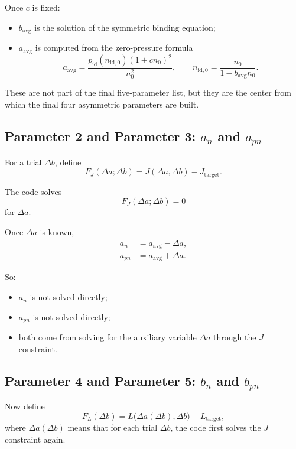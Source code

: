 \documentclass[11pt]{article}
\begin{document}
Once $c$ is fixed:
\begin{itemize}
\item $b_{\mathrm{avg}}$ is the solution of the symmetric binding equation;
\item $a_{\mathrm{avg}}$ is computed from the zero-pressure formula
\[
a_{\mathrm{avg}}
=
\frac{p_{\mathrm{id}}(n_{\mathrm{id},0})(1+cn_0)^2}{n_0^2},
\qquad
n_{\mathrm{id},0}=\frac{n_0}{1-b_{\mathrm{avg}}n_0}.
\]
\end{itemize}

These are not part of the final five-parameter list, but they are the center
from which the final four asymmetric parameters are built.

\subsection{Parameter 2 and Parameter 3: \texorpdfstring{$a_n$}{an} and \texorpdfstring{$a_{pn}$}{apn}}

For a trial $\Delta b$, define
\begin{equation}
F_J(\Delta a;\Delta b)
=
J(\Delta a,\Delta b)-J_{\mathrm{target}}.
\end{equation}

The code solves
\begin{equation}
F_J(\Delta a;\Delta b)=0
\end{equation}
for $\Delta a$.

Once $\Delta a$ is known,
\begin{align}
a_n &= a_{\mathrm{avg}}-\Delta a, \\
a_{pn} &= a_{\mathrm{avg}}+\Delta a.
\end{align}

So:
\begin{itemize}
\item $a_n$ is not solved directly;
\item $a_{pn}$ is not solved directly;
\item both come from solving for the auxiliary variable $\Delta a$ through the
$J$ constraint.
\end{itemize}

\subsection{Parameter 4 and Parameter 5: \texorpdfstring{$b_n$}{bn} and \texorpdfstring{$b_{pn}$}{bpn}}

Now define
\begin{equation}
F_L(\Delta b)
=
L\big(\Delta a(\Delta b),\Delta b\big)-L_{\mathrm{target}},
\end{equation}
where $\Delta a(\Delta b)$ means that for each trial $\Delta b$, the code
first solves the $J$ constraint again.
\end{document}
